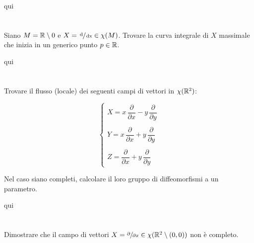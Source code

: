 qui

%

\newpage

%

\section{}\label{es2-29}

\begin{tcolorbox}
	Siano $ M = \mathbb{R} \setminus 0 $ e $ X = \sfrac{\operatorname{d}}{\operatorname{dx}} \in \chi(M) $. Trovare la curva integrale di $ X $ massimale che inizia in un generico punto $ p \in \mathbb{R} $.
\end{tcolorbox}

qui

%

\newpage

%

\section{}\label{es2-30}

\begin{tcolorbox}
	Trovare il flusso (locale) dei seguenti campi di vettori in $ \chi(\mathbb{R}^{2}) $:
	
	\begin{equation}
		\begin{cases}
			X = x \, \dfrac{\partial}{\partial x} - y \, \dfrac{\partial}{\partial y}\\\\
			Y = x \, \dfrac{\partial}{\partial x} + y \, \dfrac{\partial}{\partial y}\\\\
			Z = \dfrac{\partial}{\partial x} + y \, \dfrac{\partial}{\partial y}
		\end{cases}
	\end{equation}

	Nel caso siano completi, calcolare il loro gruppo di diffeomorfismi a un parametro.
\end{tcolorbox}

qui

%

\newpage

%

\section{}\label{es2-31}

\begin{tcolorbox}
	Dimostrare che il campo di vettori $ X = \sfrac{\partial}{\partial x} \in \chi(\mathbb{R}^{2} \setminus (0,0)) $ non è completo.
\end{tcolorbox}

